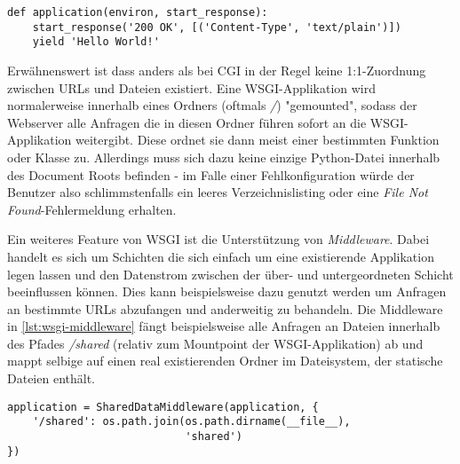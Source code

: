 \begin{lstlisting}[caption=Einfache WSGI-Applikation]
def application(environ, start_response):
    start_response('200 OK', [('Content-Type', 'text/plain')])
    yield 'Hello World!'
\end{lstlisting}

Erwähnenswert ist dass anders als bei CGI in der Regel keine 1:1-Zuordnung zwischen URLs und Dateien
existiert. Eine WSGI-Applikation wird normalerweise innerhalb eines Ordners (oftmals \emph{/})
"gemounted", sodass der Webserver alle Anfragen die in diesen Ordner führen sofort an die
WSGI-Applikation weitergibt. Diese ordnet sie dann meist einer bestimmten Funktion oder Klasse zu.
Allerdings muss sich dazu keine einzige Python-Datei innerhalb des Document Roots befinden - im
Falle einer Fehlkonfiguration würde der Benutzer also schlimmstenfalls ein leeres Verzeichnislisting
oder eine \emph{File Not Found}-Fehlermeldung erhalten.

Ein weiteres Feature von WSGI ist die Unterstützung von \emph{Middleware}. Dabei handelt es sich um
Schichten die sich einfach um eine existierende Applikation legen lassen und den Datenstrom
zwischen der über- und untergeordneten Schicht beeinflussen können. Dies kann beispielsweise dazu
genutzt werden um Anfragen an bestimmte URLs abzufangen und anderweitig zu behandeln. Die Middleware
in \autoref{lst:wsgi-middleware} fängt beispielsweise alle Anfragen an Dateien innerhalb des Pfades
\emph{/shared} (relativ zum Mountpoint der WSGI-Applikation) ab und mappt selbige auf einen real
existierenden Ordner im Dateisystem, der statische Dateien enthält.

\begin{lstlisting}[caption=WSGI-Middleware,label=lst:wsgi-middleware]
application = SharedDataMiddleware(application, {
    '/shared': os.path.join(os.path.dirname(__file__),
                            'shared')
})
\end{lstlisting}
